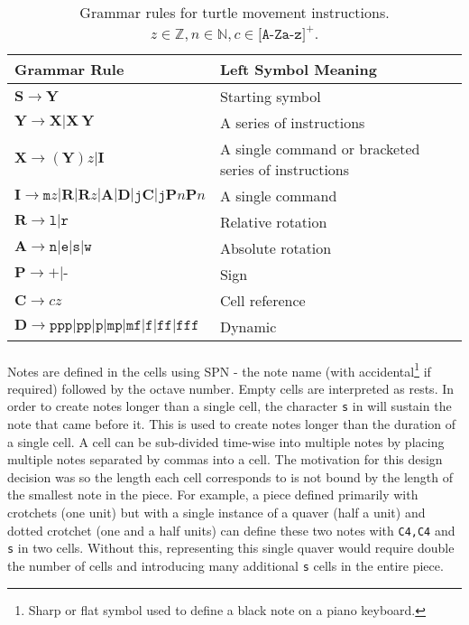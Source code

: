\begin{table}
\centering
\caption{Grammar rules for turtle movement instructions. $z \in \mathbb{Z}, n \in \mathbb{N}, c \in \texttt{[A-Za-z]}^{+}$.}
\vspace{1pt}
\begin{tabular}{|l|l|} \hline
\textbf{Grammar Rule}&\textbf{Left Symbol Meaning}\\ \hline
\( \mathbf{S} \rightarrow \mathbf{Y} \)& Starting symbol\\ \hline
\( \mathbf{Y} \rightarrow \mathbf{X} | \mathbf{X} \ \mathbf{Y} \)& A series of instructions\\ \hline
\( \mathbf{X} \rightarrow (\mathbf{Y})z|\mathbf{I} \)& A single command or bracketed series of instructions\\ \hline
\( \mathbf{I} \rightarrow \texttt{m}z|\mathbf{R}|\mathbf{R}z|\mathbf{A}|\mathbf{D}|\texttt{j}\mathbf{C}|\texttt{j}\mathbf{P}n\mathbf{P}n \)& A single command\\ \hline
\( \mathbf{R} \rightarrow \texttt{l}|\texttt{r} \)& Relative rotation\\ \hline
\( \mathbf{A} \rightarrow \texttt{n}|\texttt{e}|\texttt{s}|\texttt{w} \)& Absolute rotation\\ \hline
\( \mathbf{P} \rightarrow \texttt{+}|\texttt{-} \)& Sign\\ \hline
\( \mathbf{C} \rightarrow cz \)& Cell reference\\ \hline
\( \mathbf{D} \rightarrow \texttt{ppp}|\texttt{pp}|\texttt{p}|\texttt{mp}|\texttt{mf}|\texttt{f}|\texttt{ff}|\texttt{fff} \)& Dynamic\\
\hline\end{tabular}
\label{tab:grammar}
\end{table}

\paragraph{} Notes are defined in the cells using SPN - the note name (with accidental\footnote{Sharp or flat symbol used to define a black note on a piano keyboard.} if required) followed by the octave number. Empty cells are interpreted as rests. In order to create notes longer than a single cell, the character \texttt{s} in will sustain the note that came before it. This is used to create notes longer than the duration of a single cell. A cell can be sub-divided time-wise into multiple notes by placing multiple notes separated by commas into a cell. The motivation for this design decision was so the length each cell corresponds to is not bound by the length of the smallest note in the piece. For example, a piece defined primarily with crotchets (one unit) but with a single instance of a quaver (half a unit) and dotted crotchet (one and a half units) can define these two notes with \texttt{C4,C4} and \texttt{s} in two cells. Without this, representing this single quaver would require double the number of cells and introducing many additional \texttt{s} cells in the entire piece.

